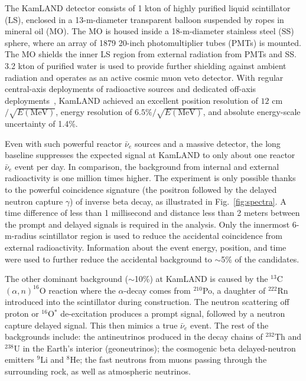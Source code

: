 The KamLAND detector consists of 1 kton of highly purified liquid scintillator (LS), enclosed in a 13-m-diameter transparent balloon suspended by ropes in mineral oil (MO). 
The MO is housed inside a 18-m-diameter stainless steel (SS) sphere, where an array of 1879 20-inch photomultiplier tubes (PMTs) is mounted. 
The MO shields the inner LS region from external radiation from PMTs and SS. 
3.2 kton of purified water is used to provide further shielding against ambient radiation and operates as an active cosmic muon veto detector. 
With regular central-axis deployments of radioactive sources and dedicated off-axis deployments~\cite{KamLAND-4pi}, KamLAND achieved an excellent position resolution of $12$ cm$/\sqrt{E(\textrm{MeV})}$, energy resolution of $6.5\%/\sqrt{E(\textrm{MeV})}$, and absolute energy-scale uncertainty of 1.4\%.

Even with such powerful reactor $\bar\nu_e$ sources and a massive detector, the long baseline suppresses the expected signal at KamLAND to only about one reactor $\bar\nu_e$ event per day. 
In comparison, the background from internal and external radioactivity is one million times higher. 
The experiment is only possible thanks to the powerful coincidence signature (the positron followed by the delayed neutron capture $\gamma$) of inverse beta decay, as illustrated in Fig.~\ref{fig:spectra}. 
A time difference of less than 1 millisecond and distance less than 2 meters between the prompt and delayed signals is required in the analysis. 
Only the innermost 6-m-radius scintillator region is used to reduce the accidental coincidence from external radioactivity. 
Information about the event energy, position, and time were used to further reduce the accidental background to $\sim$5\% of the candidates.

The other dominant background ($\sim$10\%) at KamLAND is caused by the $^{13}$C$(\alpha,n)^{16}$O reaction where the $\alpha$-decay comes from $^{210}$Po, a daughter of $^{222}$Rn introduced into the scintillator during construction. 
The neutron scattering off proton or $^{16}$O$^*$ de-excitation produces a prompt signal, followed by a neutron capture delayed signal. This then mimics a true $\bar\nu_e$ event. The rest of the backgrounds include: the antineutrinos produced in the decay chains of $^{232}$Th and $^{238}$U in the Earth's interior (geoneutrinos); the cosmogenic beta delayed-neutron emitters $^{9}$Li and $^{8}$He;  the fast neutrons from muons passing through the surrounding rock, as well as atmospheric neutrinos. 

